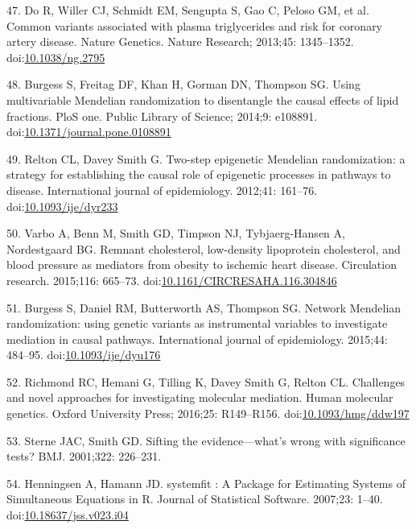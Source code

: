 \documentclass[]{article}
\begin{document}
\leavevmode\hypertarget{ref-Do2013}{}%
47. Do R, Willer CJ, Schmidt EM, Sengupta S, Gao C, Peloso GM, et al.
Common variants associated with plasma triglycerides and risk for
coronary artery disease. Nature Genetics. Nature Research; 2013;45:
1345--1352. doi:\href{https://doi.org/10.1038/ng.2795}{10.1038/ng.2795}

\leavevmode\hypertarget{ref-Burgess2014a}{}%
48. Burgess S, Freitag DF, Khan H, Gorman DN, Thompson SG. Using
multivariable Mendelian randomization to disentangle the causal effects
of lipid fractions. PloS one. Public Library of Science; 2014;9:
e108891.
doi:\href{https://doi.org/10.1371/journal.pone.0108891}{10.1371/journal.pone.0108891}

\leavevmode\hypertarget{ref-Relton2012}{}%
49. Relton CL, Davey Smith G. Two-step epigenetic Mendelian
randomization: a strategy for establishing the causal role of epigenetic
processes in pathways to disease. International journal of epidemiology.
2012;41: 161--76.
doi:\href{https://doi.org/10.1093/ije/dyr233}{10.1093/ije/dyr233}

\leavevmode\hypertarget{ref-Varbo2015}{}%
50. Varbo A, Benn M, Smith GD, Timpson NJ, Tybjaerg-Hansen A,
Nordestgaard BG. Remnant cholesterol, low-density lipoprotein
cholesterol, and blood pressure as mediators from obesity to ischemic
heart disease. Circulation research. 2015;116: 665--73.
doi:\href{https://doi.org/10.1161/CIRCRESAHA.116.304846}{10.1161/CIRCRESAHA.116.304846}

\leavevmode\hypertarget{ref-Burgess2015}{}%
51. Burgess S, Daniel RM, Butterworth AS, Thompson SG. Network Mendelian
randomization: using genetic variants as instrumental variables to
investigate mediation in causal pathways. International journal of
epidemiology. 2015;44: 484--95.
doi:\href{https://doi.org/10.1093/ije/dyu176}{10.1093/ije/dyu176}

\leavevmode\hypertarget{ref-Richmond2016}{}%
52. Richmond RC, Hemani G, Tilling K, Davey Smith G, Relton CL.
Challenges and novel approaches for investigating molecular mediation.
Human molecular genetics. Oxford University Press; 2016;25: R149--R156.
doi:\href{https://doi.org/10.1093/hmg/ddw197}{10.1093/hmg/ddw197}

\leavevmode\hypertarget{ref-Sterne2001}{}%
53. Sterne JAC, Smith GD. Sifting the evidence---what's wrong with
significance tests? BMJ. 2001;322: 226--231.

\leavevmode\hypertarget{ref-Henningsen2007}{}%
54. Henningsen A, Hamann JD. systemfit : A Package for Estimating
Systems of Simultaneous Equations in R. Journal of Statistical Software.
2007;23: 1--40.
doi:\href{https://doi.org/10.18637/jss.v023.i04}{10.18637/jss.v023.i04}
\end{document}
